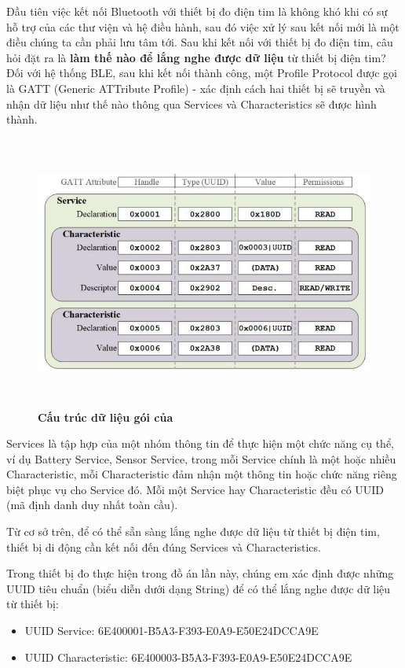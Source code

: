 Đầu tiên việc kết nối Bluetooth với thiết bị đo điện tim là không khó khi có sự hỗ trợ của các thư viện và hệ điều hành, sau đó việc xử lý sau
kết nối mới là một điều chúng ta cần phải lưu tâm tới. Sau khi kết nối với thiết bị đo điện tim, câu hỏi đặt ra là \textbf{làm thế nào
để lắng nghe được dữ liệu} từ thiết bị điện tim? Đối với hệ thống BLE, sau khi kết nối thành công, một Profile Protocol được gọi
là GATT \cite{intro_ble_gatt} (Generic ATTribute Profile) - xác định cách hai thiết bị sẽ truyền và nhận dữ liệu như thế nào thông qua
Services và Characteristics sẽ được hình thành.
\begin{figure}[H]
  \centering
  \includegraphics[width=15cm,height=9cm]{Images/mobile_app/ecg_calculation/ble_gatt.png}
  \caption[Cấu trúc dữ liệu gói của]{\bfseries \fontsize{12pt}{0pt}
  \selectfont Cấu trúc dữ liệu gói của}
  \label{ble_gatt} %
\end{figure}
Services là tập hợp của một nhóm thông tin để thực hiện một chức năng cụ thể,
ví dụ Battery Service, Sensor Service, trong mỗi Service chính là một hoặc nhiều Characteristic, mỗi Characteristic đảm nhận
một thông tin hoặc chức năng riêng biệt phục vụ cho Service đó. Mỗi một Service hay Characteristic đều có UUID (mã định danh duy nhất toàn cầu).

Từ cơ sở trên, để có thể sẵn sàng lắng nghe được dữ liệu từ thiết bị điện tim, thiết bị di động cần kết nối đến đúng Services và Characteristics.

Trong thiết bị đo thực hiện trong đồ án lần này, chúng em xác định được những UUID tiêu chuẩn (biểu diễn dưới dạng String) để có thể lắng nghe được dữ liệu từ
thiết bị:
\begin{itemize}
  \item UUID Service: 6E400001-B5A3-F393-E0A9-E50E24DCCA9E
  \item UUID Characteristic: 6E400003-B5A3-F393-E0A9-E50E24DCCA9E
\end{itemize}


